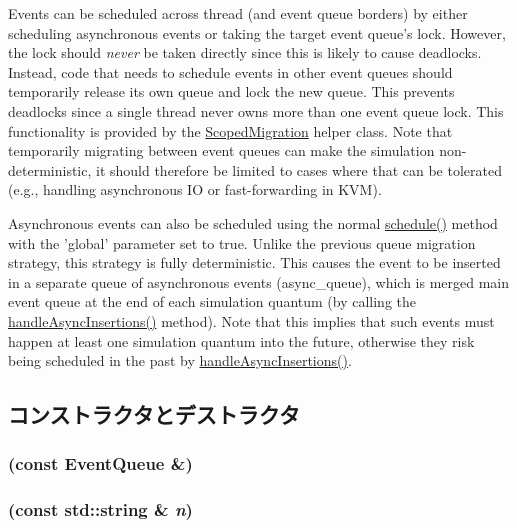 Events can be scheduled across thread (and event queue borders) by either scheduling asynchronous events or taking the target event queue's lock. However, the lock should {\itshape never\/} be taken directly since this is likely to cause deadlocks. Instead, code that needs to schedule events in other event queues should temporarily release its own queue and lock the new queue. This prevents deadlocks since a single thread never owns more than one event queue lock. This functionality is provided by the \hyperlink{classEventQueue_1_1ScopedMigration}{ScopedMigration} helper class. Note that temporarily migrating between event queues can make the simulation non-\/deterministic, it should therefore be limited to cases where that can be tolerated (e.g., handling asynchronous IO or fast-\/forwarding in KVM).

Asynchronous events can also be scheduled using the normal \hyperlink{classEventQueue_a6e13c0d68fbc26df6eff27313813b8a4}{schedule()} method with the 'global' parameter set to true. Unlike the previous queue migration strategy, this strategy is fully deterministic. This causes the event to be inserted in a separate queue of asynchronous events (async\_\-queue), which is merged main event queue at the end of each simulation quantum (by calling the \hyperlink{classEventQueue_a2f9d0ed8258183804bc764aa3b859f70}{handleAsyncInsertions()} method). Note that this implies that such events must happen at least one simulation quantum into the future, otherwise they risk being scheduled in the past by \hyperlink{classEventQueue_a2f9d0ed8258183804bc764aa3b859f70}{handleAsyncInsertions()}. 

\subsection{コンストラクタとデストラクタ}
\hypertarget{classEventQueue_aac902b23c2f4ad571d6229b56ea09d0b}{
\subsubsection[{EventQueue}]{ (const {\bf EventQueue} \&)}}
\label{classEventQueue_aac902b23c2f4ad571d6229b56ea09d0b}
\hypertarget{classEventQueue_a6034f8afa29a6178a4b6d0e371344d0d}{
\subsubsection[{EventQueue}]{ (const std::string \& {\em n})}}
\label{classEventQueue_a6034f8afa29a6178a4b6d0e371344d0d}


